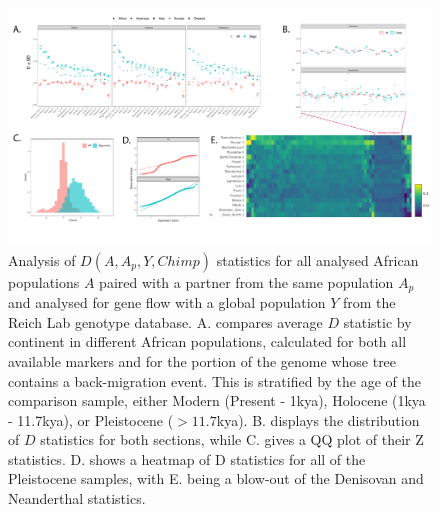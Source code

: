 \documentclass{article}
\begin{document}
\begin{figure}
	\centering
	\includegraphics[width=\textwidth]{../plot/dstats.pdf}
	\caption{Analysis of $D(A, A_p, Y, Chimp)$ statistics for all analysed African populations $A$ paired with a partner from the same population $A_p$ and analysed for gene flow with a global population $Y$ from the Reich Lab genotype database. A. compares average $D$ statistic by continent in different African populations, calculated for both all available markers and for the portion of the genome whose tree contains a back-migration event. This is stratified by the age of the comparison sample, either Modern (Present - 1kya), Holocene (1kya - 11.7kya), or Pleistocene ($>11.7$kya). B. displays the distribution of $D$ statistics for both sections, while C. gives a QQ plot of their Z statistics. D. shows a heatmap of D statistics for all of the Pleistocene samples, with E. being a blow-out of the Denisovan and Neanderthal statistics.}
	\label{dstats}
\end{figure}
\end{document}
